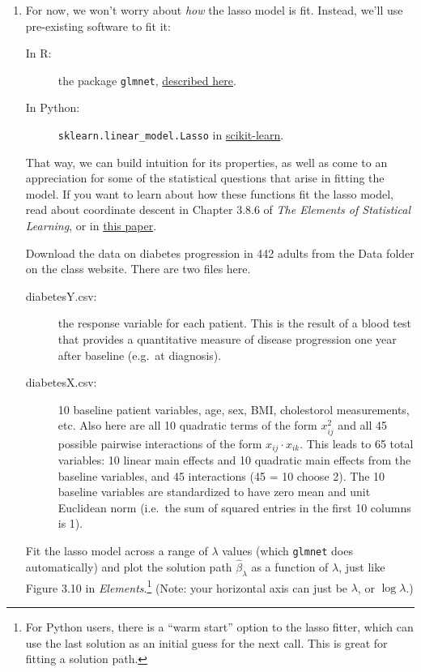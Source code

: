 \documentclass{article}
\begin{document}
\begin{enumerate}[label=(\Alph*)]

\item For now, we won't worry about \textit{how} the lasso model is fit.  Instead, we'll use pre-existing software to fit it:
\begin{description}
\item[In R:] the package \verb|glmnet|, \href{https://web.stanford.edu/~hastie/glmnet/glmnet_alpha.html}{described here}.
\item[In Python:] \verb|sklearn.linear_model.Lasso| in \href{http://scikit-learn.org/stable/index.html}{scikit-learn}.
\end{description}
That way, we can build intuition for its properties, as well as come to an appreciation for some of the statistical questions that arise in fitting the model.  If you want to learn about how these functions fit the lasso model, read about coordinate descent in Chapter 3.8.6 of \textit{The Elements of Statistical Learning}, or in \href{http://arxiv.org/pdf/0708.1485.pdf}{this paper}.

Download the data on diabetes progression in 442 adults from the Data folder on the class website.  There are two files here.
\begin{description}
\item[diabetesY.csv:] the response variable for each patient.  This is the result of a blood test that provides a quantitative measure of disease progression one year after baseline (e.g.~at diagnosis).
\item[diabetesX.csv:] 10 baseline patient variables, age, sex, BMI, cholestorol measurements, etc.  Also here are all 10 quadratic terms of the form $x_{ij}^2$ and all 45 possible pairwise interactions of the form $x_{ij} \cdot x_{ik}$.  This leads to 65 total variables: 10 linear main effects and 10 quadratic main effects from the baseline variables, and 45 interactions (45 = 10 choose 2).  The 10  baseline variables are standardized to have zero mean and unit Euclidean norm (i.e.~the sum of squared entries in the first 10 columns is 1).
\end{description}

Fit the lasso model across a range of $\lambda$ values (which \verb|glmnet| does automatically) and plot the solution path $\hat{\beta}_{\lambda}$ as a function of $\lambda$, just like Figure 3.10 in \textit{Elements}.\footnote{For Python users, there is a ``warm start'' option to the lasso fitter, which can use the last solution as an initial guess for the next call.  This is great for fitting a solution path.}  (Note: your horizontal axis can just be $\lambda$, or $\log \lambda$.)


\end{enumerate}
\end{document}
